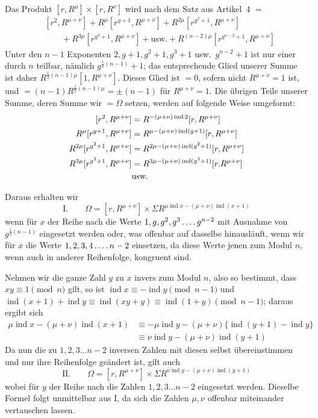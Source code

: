 Das Produkt $[r,R^\mu]\times[r,R^\nu]$ wird nach dem Satz aus Artikel~4 $=$
\[
\begin{aligned}
&[r^2,R^{\mu+\nu}]+R^\mu[r^{g+1},R^{\mu+\nu}]+R^{2\mu}[r^{g^2+1},R^{\mu+\nu}]\\
&\qquad+R^{3\mu}[r^{g^3+1},R^{\mu+\nu}]+\text{usw.}+R^{(n-2)\mu}[r^{g^{n-2}+1},R^{\mu+\nu}]
\end{aligned}
\]
Unter den $n-1$ Exponenten $2,g+1,g^2+1,g^3+1$ usw.\ $g^{n-2}+1$ ist nur einer durch $n$ teilbar, nämlich $g^{\frac12(n-1)}+1$; das entsprechende Glied unserer Summe ist daher $R^{\frac12(n-1)\mu}[1,R^{\mu+\nu}]$. Dieses Glied ist $=0$, sofern nicht $R^{\mu+\nu}=1$ ist, und $=(n-1)R^{\frac12(n-1)\mu}=\pm(n-1)$ für $R^{\mu+\nu}=1$. Die übrigen Teile unserer Summe, deren Summe wir $=\Omega$ setzen, werden auf folgende Weise umgeformt:
\[
\begin{aligned}
\relax[r^2,R^{\mu+\nu}]&=R^{-(\mu+\nu)\operatorname{ind}2}[r,R^{\mu+\nu}]\\
R^\mu[r^{g+1},R^{\mu+\nu}]&=R^{\mu-(\mu+\nu)\operatorname{ind}(g+1)}[r,R^{\mu+\nu}]\\
R^{2\mu}[r^{g^2+1},R^{\mu+\nu}]&=R^{2\mu-(\mu+\nu)\operatorname{ind}(g^2+1)}[r,R^{\mu+\nu}]\\
R^{3\mu}[r^{g^3+1},R^{\mu+\nu}]&=R^{3\mu-(\mu+\nu)\operatorname{ind}(g^3+1)}[r.R^{\mu+\nu}]\\
&\text{usw.}
\end{aligned}
\]

Daraus erhalten wir
\begingroup{}
\[
\text{I.}\qquad\Omega=[r,R^{\mu+\nu}]\times\Sigma R^{\mu\operatorname{ind}x-(\mu+\nu)\operatorname{ind}(x+1)}
\]
\endgroup
wenn für $x$ der Reihe nach die Werte $1,g,g^2,g^3\mathinner{.\,.\,.\,.} g^{n-2}$ mit Ausnahme von $g^{\frac12(n-1)}$ eingesetzt werden oder, was offenbar auf dasselbe hinausläuft, wenn wir für $x$ die Werte $1,2,3,4\mathinner{.\,.\,.\,.} n-2$ einsetzen, da diese Werte jenen zum Modul $n$, wenn auch in anderer Reihenfolge, kongruent sind.

Nehmen wir die ganze Zahl $y$ zu $x$ invers zum Modul $n$, also so bestimmt, dass $xy\equiv1\pmod n$ gilt, so ist $\operatorname{ind}x\equiv-\operatorname{ind}y\pmod{n-1}$ und $\operatorname{ind}(x+1)+\operatorname{ind}y\equiv\operatorname{ind}(xy+y)\equiv\operatorname{ind}(1+y)\pmod{n-1}$; daraus ergibt sich
\[
\begin{aligned}
\mu\operatorname{ind}x-(\mu+\nu)\operatorname{ind}(x+1)&\equiv-\mu\operatorname{ind}y-(\mu+\nu)\{\operatorname{ind}(y+1)-\operatorname{ind}y\}\\
&\equiv\nu\operatorname{ind}y-(\mu+\nu)\operatorname{ind}(y+1)
\end{aligned}
\]
Da nun die zu $1,2,3\dots n-2$ inversen Zahlen mit diesen selbst übereinstimmen und nur ihre Reihenfolge geändert ist, gilt auch
\[
\text{II.}\qquad\Omega=[r,R^{\mu+\nu}]\times\Sigma R^{\nu\operatorname{ind}y-(\mu+\nu)\operatorname{ind}(y+1)}
\]
wobei für $y$ der Reihe nach die Zahlen $1,2,3\dots n-2$ eingesetzt werden. Dieselbe Formel folgt unmittelbar aus I, da sich die Zahlen $\mu,\nu$ offenbar miteinander vertauschen lassen.

